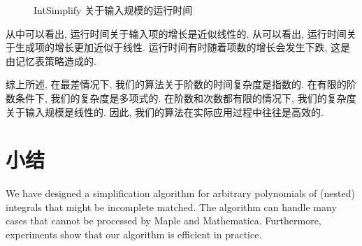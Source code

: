 \begin{figure}[htb]
\centering
{}
\caption{IntSimplify 关于输入规模的运行时间}
\label{items_all}
\end{figure}

从中可以看出, 运行时间关于输入项的增长是近似线性的. 从可以看出, 运行时间关于生成项的增长更加近似于线性. 运行时间有时随着项数的增长会发生下跌, 这是由记忆表策略造成的. 

综上所述, 在最差情况下, 我们的算法关于阶数的时间复杂度是指数的. 在有限的阶数条件下, 我们的复杂度是多项式的. 在阶数和次数都有限的情况下, 我们的复杂度关于输入规模是线性的. 因此, 我们的算法在实际应用过程中往往是高效的.  

\section{小结} \label{Conclusion-03} 
We have designed a simplification algorithm for arbitrary polynomials of (nested) integrals that might be incomplete matched. The algorithm can handle many cases that cannot be processed by Maple and Mathematica. Furthermore, experiments show that our algorithm is efficient in practice.
